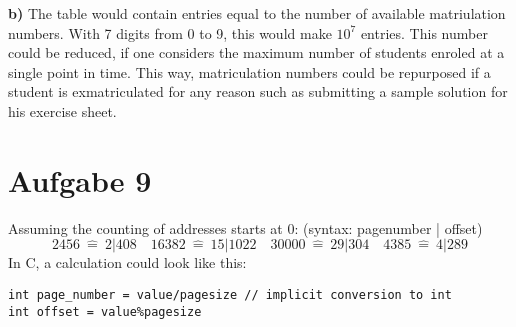 \documentclass{article}
\begin{document}
\textbf{b)} The table would contain entries equal to the number of available
matriulation numbers. With 7 digits from 0 to 9, this would make \( 10 ^{7} \) entries.
This number could be reduced, if one considers the maximum number of students enroled
at a single point in time. This way, matriculation numbers could be repurposed
if a student is exmatriculated for any reason such as submitting a sample solution
for his exercise sheet.

\section*{Aufgabe 9}
Assuming the counting of addresses starts at 0: (syntax: pagenumber | offset)\\
\[ 
    2456 \ \hat = \ 2 | 408 \quad 16382 \ \hat = \ 15 | 1022 \quad 30000 \ \hat =
    \ 29 | 304 \quad 4385 \ \hat = \ 4 | 289
\]
In C, a calculation could look like this:
\begin{lstlisting}
int page_number = value/pagesize // implicit conversion to int
int offset = value%pagesize
\end{lstlisting}
\end{document}
